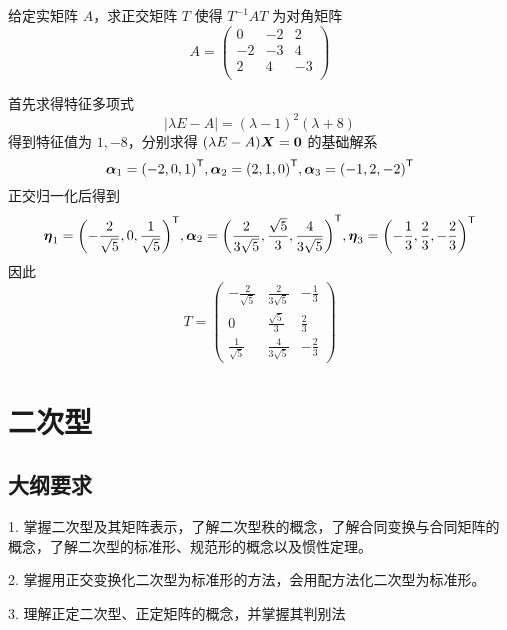 \begin{example}
	给定实矩阵 $A$，求正交矩阵 $T$ 使得 $T^{-1}AT$ 为对角矩阵
	\[ A=\left(
		\begin{matrix}
				0  & -2 & 2  \\
				-2 & -3 & 4  \\
				2  & 4  & -3 \\
			\end{matrix}
		\right) \]
\end{example}

\begin{solution}
	首先求得特征多项式
	\[ |\lambda E - A| = (\lambda-1)^2(\lambda+8) \]
	得到特征值为 $1, -8$，分别求得 $(\lambda E - A) \boldsymbol{X} = \boldsymbol{0}$ 的基础解系
	\[ \boldsymbol{\alpha}_1 = {(-2, 0, 1)}^\mathsf{T}, \boldsymbol{\alpha}_2 = {(2, 1, 0)}^\mathsf{T}, \boldsymbol{\alpha}_3 = {(-1, 2, -2)}^\mathsf{T} \]
	正交归一化后得到
	\[ \boldsymbol{\eta}_1 = {\left(-\frac{2}{\sqrt{5}}, 0, \frac{1}{\sqrt{5}}\right)}^\mathsf{T}, \boldsymbol{\alpha}_2 = {\left(\frac{2}{3\sqrt{5}}, \frac{\sqrt{5}}{3}, \frac{4}{3 \sqrt{5}}\right)}^\mathsf{T}, \boldsymbol{\eta}_3 = {\left(-\frac{1}{3}, \frac{2}{3}, -\frac{2}{3}\right)}^\mathsf{T} \]
	因此
	\[ T = \left(\begin{matrix}
				-\frac{2}{\sqrt{5}} & \frac{2}{3\sqrt{5}}  & -\frac{1}{3} \\ 
				0                   & \frac{\sqrt{5}}{3}   & \frac{2}{3}  \\
				\frac{1}{\sqrt{5}}  & \frac{4}{3 \sqrt{5}} & -\frac{2}{3}
			\end{matrix}\right) \]
\end{solution}

\section{二次型}

\subsection{大纲要求}

1. 掌握二次型及其矩阵表示，了解二次型秩的概念，了解合同变换与合同矩阵的概念，了解二次型的标准形、规范形的概念以及惯性定理。

2. 掌握用正交变换化二次型为标准形的方法，会用配方法化二次型为标准形。

3. 理解正定二次型、正定矩阵的概念，并掌握其判别法
